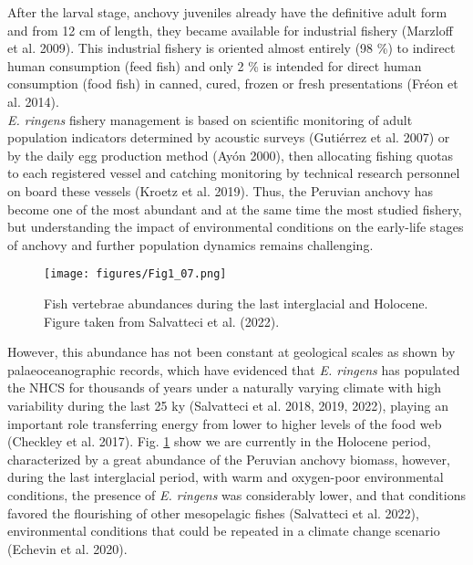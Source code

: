 After the larval stage, anchovy juveniles already have the definitive adult form and from 12 cm of length, they became available for industrial fishery \citep{MarzShin2009}(Marzloff et al. 2009). This industrial fishery is oriented almost entirely (98 \%) to indirect human consumption (feed fish) and only 2 \% is intended for direct human consumption (food fish) in canned, cured, frozen or fresh presentations \citep{FreoSuei2014}(Fréon et al. 2014).\\

\textit{E. ringens} fishery management is based on scientific monitoring of adult population indicators determined by acoustic surveys \citep{GutiSwar2007}(Gutiérrez et al. 2007) or by the daily egg production method \citep{Ayon2000}(Ayón 2000), then allocating fishing quotas to each registered vessel and catching monitoring by technical research personnel on board these vessels \citep{KroeSanc2019}(Kroetz et al. 2019). Thus, the Peruvian anchovy has become one of the most abundant and at the same time the most studied fishery, but understanding the impact of environmental conditions on the early-life stages of anchovy and further population dynamics remains challenging.\\

\begin{figure}[ht]
	\texttt{[image: figures/Fig1\_07.png]}
	\centering
	\caption{Fish vertebrae abundances during the last interglacial and Holocene. Figure taken from \citep{Salv2022} Salvatteci et al. (2022).}
	\label{fig:Fig1_07}
\end{figure}

However, this abundance has not been constant at geological scales as shown by palaeoceanographic records, which have evidenced that \textit{E. ringens} has populated the NHCS for thousands of years under a naturally varying climate with high variability during the last 25 ky \citep{Salv2018,Salv2019,Salv2022}(Salvatteci et al. 2018, 2019, 2022), playing an important role transferring energy from lower to higher levels of the food web \citep{ChecAsch2017}(Checkley et al. 2017). Fig. \ref{fig:Fig1_07} show we are currently in the Holocene period, characterized by a great abundance of the Peruvian anchovy biomass, however, during the last interglacial period, with warm and oxygen-poor environmental conditions, the presence of \textit{E. ringens} was considerably lower, and that conditions favored the flourishing of other mesopelagic fishes \citep{Salv2022}(Salvatteci et al. 2022), environmental conditions that could be repeated in a climate change scenario \citep{EcheGeva2020}(Echevin et al. 2020).\\


